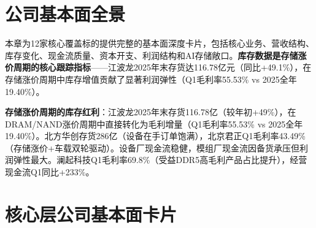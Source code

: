
\section{公司基本面全景}

本章为12家核心覆盖标的提供完整的基本面深度卡片，包括核心业务、营收结构、库存变化、现金流质量、资本开支、利润结构和AI存储敞口。\textbf{库存数据是存储涨价周期的核心跟踪指标}——江波龙2025年末存货达116.78亿元（同比+49.1\%），在存储涨价周期中库存增值贡献了显著利润弹性（Q1毛利率55.53\% vs 2025全年19.40\%）。

\begin{riskbox}[基本面研究结论]
\textbf{存储涨价周期的库存红利}：江波龙2025年末存货116.78亿（较年初+49\%），在DRAM/NAND涨价周期中直接转化为毛利增量（Q1毛利率55.53\% vs 2025全年19.40\%）。北方华创存货286亿（设备在手订单饱满），北京君正Q1毛利率43.49\%（存储涨价+车载双轮驱动）。设备厂现金流稳健，模组厂现金流因备货承压但利润弹性最大。澜起科技Q1毛利率69.8\%（受益DDR5高毛利产品占比提升），经营现金流Q1同比+233\%。
\end{riskbox}

\section{核心层公司基本面卡片}

